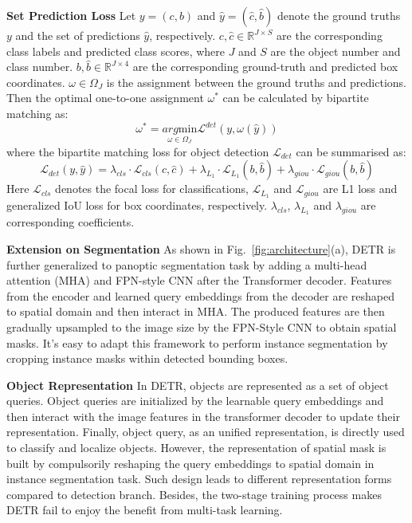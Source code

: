 \documentclass{article}
\begin{document}
\textbf{Set Prediction Loss}
Let $y=(c, b)$ and $\hat{y}=(\hat{c}, \hat{b})$ denote the ground truths $y$ and the set of predictions $\hat{y}$, respectively. $c, \hat{c}\in\mathbb{R}^{J \times S}$ are the corresponding class labels and predicted class scores, where $J$ and $S$ are the object number and class number. $b, \hat{b}\in\mathbb{R}^{J \times 4}$ are the corresponding ground-truth and predicted box coordinates. $\omega \in \Omega_{J}$ is the assignment between the ground truths and predictions. Then the optimal one-to-one assignment $\omega^{*}$ can be calculated by bipartite matching \cite{kuhn1955hungarian} as:
\begin{equation}
\label{eq:bipartite_match}
\omega^{*}=\underset{\omega \in \Omega_{J}}{arg\mathrm{min}}\mathcal{L}^{det}(y,\omega(\hat{y}))
\end{equation}
where the bipartite matching loss for object detection $\mathcal{L}_{det}$ can be summarised as:
\begin{equation}
\label{eq:bipartite_cost}
\mathcal{L}_{det}(y,\hat{y}) = \lambda_{cls} \cdot \mathcal{L}_{cls}(c,\hat{c}) + \lambda_{L_{1}} \cdot \mathcal{L}_{L_{1}}(b,\hat{b}) + \lambda_{giou} \cdot \mathcal{L}_{giou}(b,\hat{b})
\end{equation}
Here $\mathcal{L}_{cls}$ denotes the focal loss \cite{lin2017focalloss} for classifications, $\mathcal{L}_{L_{1}}$ and $\mathcal{L}_{giou}$ are L1 loss and generalized IoU loss \cite{rezatofighi2019giou} for box coordinates, respectively. $\lambda_{cls}$, $\lambda_{L_{1}}$ and $\lambda_{giou}$ are corresponding coefficients. 

\textbf{Extension on Segmentation}
As shown in Fig.~\ref{fig:architecture}(a), DETR is further generalized to panoptic segmentation task by adding a multi-head attention (MHA) and FPN-style CNN after the Transformer decoder. Features from the encoder and learned query embeddings from the decoder are reshaped to spatial domain and then interact in MHA. The produced features are then gradually upsampled to the image size by the FPN-Style CNN to obtain spatial masks. It's easy to adapt this framework to perform instance segmentation by cropping instance masks within detected bounding boxes. 

\textbf{Object Representation}
In DETR, objects are represented as a set of object queries. Object queries are initialized by the learnable query embeddings and then interact with the image features in the transformer decoder to update their representation. Finally, object query, as an unified representation, is directly used to classify and localize objects. However, the representation of spatial mask is built by compulsorily reshaping the query embeddings to spatial domain in instance segmentation task. Such design leads to different representation forms compared to detection branch. Besides, the two-stage training process makes DETR fail to enjoy the benefit from multi-task learning. 
\end{document}
